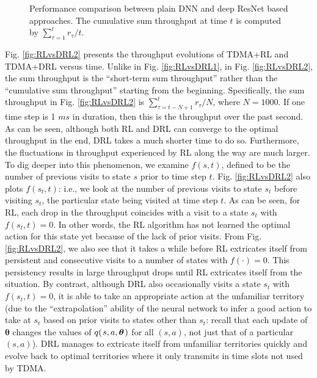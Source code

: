 \documentclass[journal,comsoc]{IEEEtran}
\begin{document}
\begin{figure*}[!t]
	\hspace{2.5cm}
	\caption{Performance comparison between plain DNN and deep ResNet based approaches. The cumulative sum throughput at time $ t $ is computed by  $\sum\nolimits_{\tau  = 1}^t {{r_\tau }/t} $.}
	\label{fig:ResNet}
\end{figure*}

Fig. \ref{fig:RLvsDRL2} presents the throughput evolutions of TDMA+RL and TDMA+DRL versus time. Unlike in Fig. \ref{fig:RLvsDRL1}, in Fig. \ref{fig:RLvsDRL2}, the sum throughput is the ``short-term sum throughput'' rather than the ``cumulative sum throughput'' starting from the beginning. Specifically, the sum throughput in Fig. \ref{fig:RLvsDRL2} is  $ \sum\nolimits_{\tau  = t - N + 1}^t {{r_\tau }} /N $, where $ N=1000 $. If one time step is 1 $ ms $ in duration, then this is the throughput over the past second. As can be seen, although both RL and DRL can converge to the optimal throughput in the end, DRL takes a much shorter time to do so. Furthermore, the fluctuations in throughput experienced by RL along the way are much larger. To dig deeper into this phenomenon, we examine $ f\left( s, t\right)  $, defined to be the number of previous visits to state $ s $ prior to time step  $ t $. Fig. \ref{fig:RLvsDRL2} also plots  $ f\left( s_t, t\right)  $: i.e., we look at the number of previous visits to state $ s_t $  before visiting $ s_t $, the particular state being visited at time step $ t $. As can be seen, for RL, each drop in the throughput coincides with a visit to a state  $ s_t $  with $ f\left( s_t, t\right)=0  $. In other words, the RL algorithm has not learned the optimal action for this state yet because of the lack of prior visits. From Fig. \ref{fig:RLvsDRL2}, we also see that it takes a while before RL extricates itself from persistent and consecutive visits to a number of states with $ f\left( \cdot \right)=0  $. This persistency results in large throughput drops until RL extricates itself from the situation.  By contrast, although DRL also occasionally visits a state $ s_t $  with $ f\left( s_t, t\right)=0  $, it is able to take an appropriate action at the unfamiliar territory (due to the ``extrapolation'' ability of the neural network to infer a good action to take at $ s_t $  based on prior visits to states other than  $ s_t $: recall that each update of $\bm{\theta}$ changes the values of  $q({\kern 1pt} s,a,\bm{\theta} {\kern 1pt} )$ for all  $\left( s, a\right)  $, not just that of a particular $\left( s, a\right)  $). DRL manages to extricate itself from unfamiliar territories quickly and evolve back to optimal territories where it only transmits in time slots not used by TDMA. 
\end{document}
